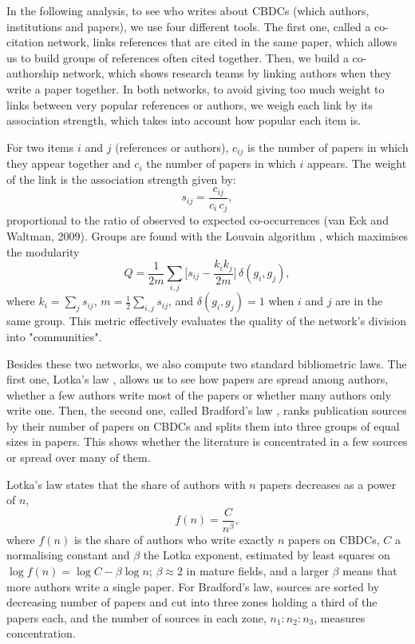 \documentclass[11pt,a4paper]{article}
\begin{document}
In the following analysis, to see who writes about CBDCs (which authors, institutions and papers), 
we use four different tools. The first one, called a co-citation network, links references that are 
cited in the same paper, which allows us to build groups of references often cited together. Then, 
we build a co-authorship network, which shows research teams by linking authors when they write a 
paper together. In both networks, to avoid giving too much weight to links between very popular references 
or authors, we weigh each link by its association strength, which takes into account how popular each item is. 

For two items $i$ and $j$ (references or authors), $c_{ij}$ is the number of papers in which they appear together and $c_i$ the number 
of papers in which $i$ appears. The weight of the link is the association strength given by:
\begin{equation}\label{eq:assoc}
s_{ij} = \frac{c_{ij}}{c_i\,c_j},
\end{equation}
proportional to the ratio of observed to expected co-occurrences (van Eck and Waltman, 2009). Groups are found with the Louvain algorithm
\parencite{blondel2008}, which maximises the modularity
\begin{equation}\label{eq:modularity}
Q = \frac{1}{2m}\sum_{i,j}\Big[s_{ij} - \frac{k_i k_j}{2m}\Big]\,\delta(g_i, g_j),
\end{equation}
where $k_i = \sum_j s_{ij}$, $m = \tfrac12\sum_{i,j} s_{ij}$, and $\delta(g_i, g_j) = 1$ when $i$ and $j$ are in the same group. This metric
effectively evaluates the quality of the network's division into "communities".


Besides these two networks, we also compute two standard bibliometric laws. The first one, Lotka’s law \parencite{lotka1926}, allows us to 
see how papers are spread among authors, whether a few authors write most of the papers or whether many 
authors only write one. Then, the second one, called Bradford’s law \parencite{bradford1934}, ranks publication sources by their number 
of papers on CBDCs and splits them into three groups of equal sizes in papers. This shows whether the literature 
is concentrated in a few sources or spread over many of them.

Lotka's law states that the share of authors with $n$ papers decreases as a power of $n$,
\begin{equation}\label{eq:lotka}
f(n) = \frac{C}{n^{\beta}},
\end{equation}
where $f(n)$ is the share of authors who write exactly $n$ papers on CBDCs, $C$ a normalising constant and 
$\beta$ the Lotka exponent, estimated by least squares on $\log f(n) = \log C - \beta \log n$; $\beta \approx 2$ in 
mature fields, and a larger $\beta$ means that more authors write a single paper. 
For Bradford's law, sources are sorted by decreasing number of papers and cut into 
three zones holding a third of the papers each, and the number of sources in each zone, 
$n_1 : n_2 : n_3$, measures concentration.
\end{document}
